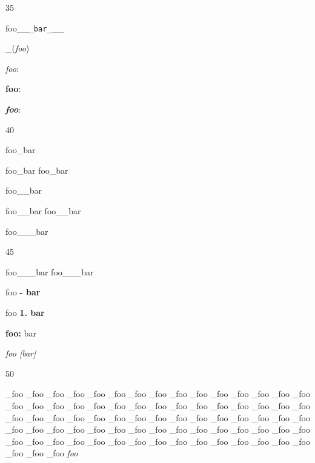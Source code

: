 35

foo\_\_\texttt{\_bar\_}\_\_

\_(\emph{foo})

\emph{foo}:

\textbf{foo}:

\textbf{\emph{foo}}:

40

foo\_bar

foo\_bar foo\_bar

foo\_\_bar

foo\_\_bar foo\_\_bar

foo\_\_\_bar

45

foo\_\_\_bar foo\_\_\_bar

foo \textbf{- bar}

foo \textbf{1. bar}

\textbf{foo:} bar

\emph{foo {[bar]}}

50

\_foo
\_foo
\_foo
\_foo
\_foo
\_foo
\_foo
\_foo
\_foo
\_foo
\_foo
\_foo
\_foo
\_foo
\_foo
\_foo
\_foo
\_foo
\_foo
\_foo
\_foo
\_foo
\_foo
\_foo
\_foo
\_foo
\_foo
\_foo
\_foo
\_foo
\_foo
\_foo
\_foo
\_foo
\_foo
\_foo
\_foo
\_foo
\_foo
\_foo
\_foo
\_foo
\_foo
\_foo
\_foo
\_foo
\_foo
\_foo
\_foo
\_foo
\_foo
\_foo
\_foo
\_foo
\_foo
\_foo
\_foo
\_foo
\_foo
\_foo
\_foo
\_foo
\_foo
\_foo
\_foo
\_foo
\_foo
\_foo
\_foo
\_foo
\_foo
\_foo
\_foo
\_foo
\_foo
\_foo
\_foo
\_foo
\emph{foo}




